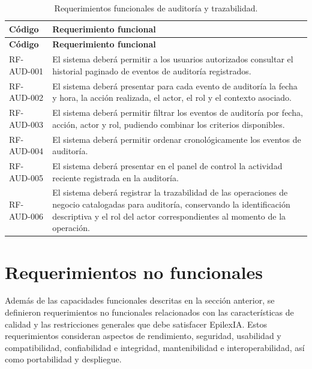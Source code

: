 \begin{longtable}{|p{}|p{}|}
    \caption{Requerimientos funcionales de auditoría y trazabilidad.}
    \label{tab:rf-aud}\\
    \hline
    \textbf{Código} & \textbf{Requerimiento funcional} \\
    \hline
    \endfirsthead

    \hline
    \textbf{Código} & \textbf{Requerimiento funcional} \\
    \hline
    \endhead

    RF-AUD-001 &
    El sistema deberá permitir a los usuarios autorizados consultar el
    historial paginado de eventos de auditoría registrados. \\
    \hline

    RF-AUD-002 &
    El sistema deberá presentar para cada evento de auditoría la fecha y hora,
    la acción realizada, el actor, el rol y el contexto asociado. \\
    \hline

    RF-AUD-003 &
    El sistema deberá permitir filtrar los eventos de auditoría por fecha,
    acción, actor y rol, pudiendo combinar los criterios disponibles. \\
    \hline

    RF-AUD-004 &
    El sistema deberá permitir ordenar cronológicamente los eventos de
    auditoría. \\
    \hline

    RF-AUD-005 &
    El sistema deberá presentar en el panel de control la actividad reciente
    registrada en la auditoría. \\
    \hline

    RF-AUD-006 &
    El sistema deberá registrar la trazabilidad de las operaciones de negocio
    catalogadas para auditoría, conservando la identificación descriptiva y el
    rol del actor correspondientes al momento de la operación. \\
    \hline
\end{longtable}


\section{Requerimientos no funcionales}
\label{sec:requerimientos-no-funcionales}

Además de las capacidades funcionales descritas en la sección anterior, se
definieron requerimientos no funcionales relacionados con las características
de calidad y las restricciones generales que debe satisfacer EpilexIA. Estos
requerimientos consideran aspectos de rendimiento, seguridad, usabilidad y
compatibilidad, confiabilidad e integridad, mantenibilidad e interoperabilidad,
así como portabilidad y despliegue.

